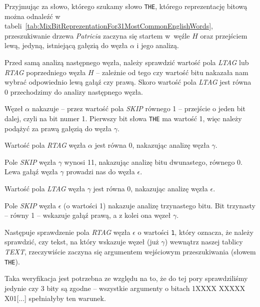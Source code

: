 	Przyjmując za słowo, którego szukamy słowo \texttt{THE}, którego reprezentację bitową można odnaleźć w tabeli~\ref{tab:MixBitReprezentationFor31MostCommonEnglishWords}, przeszukiwanie drzewa \emph{Patricia} zaczyna się startem w~węźle $H$ oraz przejściem lewą, jedyną, istniejącą gałęzią do węzła $\alpha$ i jego analizą. 
	
	Przed samą analizą następnego węzła, należy sprawdzić wartość pola \emph{LTAG} lub \emph{RTAG} poprzedniego węzła $H$ -- zależnie od tego czy wartość bitu nakazała nam wybrać odpowiednio lewą gałąź czy prawą. Skoro wartość pola \emph{LTAG} jest równa 0 przechodzimy do analizy następnego węzła.
	
	Węzeł $\alpha$ nakazuje -- przez wartość pola \emph{SKIP} równego 1 -- przejście o jeden bit dalej, czyli na bit numer 1. Pierwszy bit słowa \texttt{THE} ma wartość 1, więc należy podążyć za prawą gałęzią do węzła $\gamma$. 
	
	Wartość pola \emph{RTAG} węzła $\alpha$ jest równa 0, nakazując analizę węzła $\gamma$.
	
	Pole \emph{SKIP} węzła $\gamma$ wynosi 11, nakazując analizę bitu dwunastego, równego 0. Lewa gałąź węzła $\gamma$ prowadzi nas do węzła $\epsilon$.
	
	Wartość pola \emph{LTAG} węzła $\gamma$ jest równa 0, nakazując analizę węzła $\epsilon$. 
	
	Pole \emph{SKIP} węzła $\epsilon$ (o wartości 1) nakazuje analizę trzynastego bitu. Bit trzynasty -- równy 1 -- wskazuje gałąź prawą, a z kolei ona węzeł $\gamma$. 
	
	Następuje sprawdzenie pola \emph{RTAG} węzła $\epsilon$ o wartości \texttt{1}, który oznacza, że należy sprawdzić, czy tekst, na który wskazuje węzeł (już $\gamma$) wewnątrz naszej tablicy \emph{TEXT}, rzeczywiście zaczyna się argumentem wejściowym przeszukiwania (słowem \texttt{THE}). 
	
	Taka weryfikacja jest potrzebna ze względu na to, że do tej pory sprawdziliśmy jedynie czy 3 bity są zgodne -- wszystkie argumenty o bitach 1XXXX XXXXX X01[...] spełniałyby ten warunek.
	
